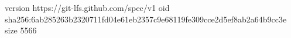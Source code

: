 version https://git-lfs.github.com/spec/v1
oid sha256:6ab285263b2320711fd04e61eb2357c9e68119fe309cce2d5ef8ab2a64b9cc3e
size 5566
